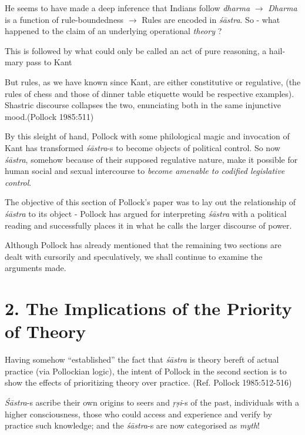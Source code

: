 He seems to have made a deep inference that Indians follow {\sl dharma} $\to$ {\sl Dharma} is a function of rule-boundedness $\to$ Rules are encoded in {\sl śāstra}. So - what happened to the claim of an underlying operational {\sl theory} ?

\newpage

This is followed by what could only be called an act of pure reasoning, a hail-mary pass to Kant
\begin{myquote}
But rules, as we have known since Kant, are either constitutive or regulative, (the rules of chess and those of dinner table etiquette would be respective examples). Shastric discourse collapses the two, enunciating both in the same injunctive mood.\hfill (Pollock 1985:511)
\end{myquote}

By this sleight of hand, Pollock with some philological magic and invocation of Kant has transformed {\sl śāstra}-s to become objects of political control. So now {\sl śāstra}, somehow because of their supposed regulative nature, make it possible for human social and sexual intercourse to {\sl become amenable to codified legislative control}.

The objective of this section of Pollock's paper was to lay out the relationship of {\sl śāstra} to its object - Pollock has argued for interpreting {\sl śāstra} with a political reading and successfully places it in what he calls the larger discourse of power.

Although Pollock has already mentioned that the remaining two sections are dealt with cursorily and speculatively, we shall continue to examine the arguments made.

\section*{2. The Implications of the Priority of Theory}

Having somehow ``established'' the fact that {\sl śāstra} is theory bereft of actual practice (via Pollockian logic), the intent of Pollock in the second section is to show the effects of prioritizing theory over practice. (Ref. Pollock 1985:512-516)

{\sl Śāstra}-s ascribe their own origins to seers and {\sl ṛṣi}-s of the past, individuals with a higher consciousness, those who could access and experience and verify by practice such knowledge; and the {\sl śāstra}-s are now categorised as {\sl myth}!

